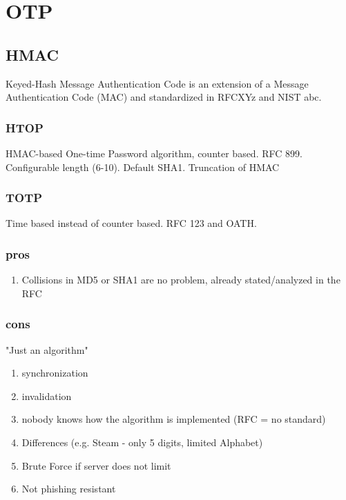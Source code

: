 \section{OTP}

\subsection{HMAC}

Keyed-Hash Message Authentication Code is an extension of a Message Authentication Code (MAC) and standardized in RFCXYz and NIST abc.

\subsubsection{HTOP}

HMAC-based One-time Password algorithm, counter based. RFC 899. Configurable length (6-10). Default SHA1. Truncation of HMAC

\subsubsection{TOTP}

Time based instead of counter based. RFC 123 and OATH.

\subsubsection{pros}

\begin{enumerate}
	\item Collisions in MD5 or SHA1 are no problem, already stated/analyzed in the RFC
\end{enumerate}

\subsubsection{cons}

"Just an algorithm"

\begin{enumerate}
	\item synchronization
	\item invalidation
	\item nobody knows how the algorithm is implemented (RFC = no standard)
	\item Differences (e.g. Steam - only 5 digits, limited Alphabet)
	\item Brute Force if server does not limit
	\item Not phishing resistant
\end{enumerate}